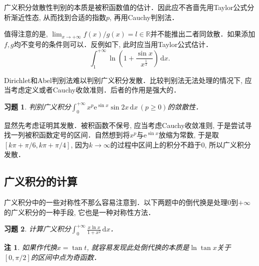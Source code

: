\documentclass[11pt,a4paper]{ctexart}
\makeatletter
\theoremstyle{thmseries} %
\theoremstyle{exerseries}
\newtheorem{exer}{习题}[section]
\newtheorem*{rem}{注}
\renewenvironment{proof}[1][\proofname]{\par
  \pushQED{\qed}%
  \normalfont \topsep6\p@\@plus6\p@\relax
  \trivlist
  \item[\hskip\labelsep
        \itshape
    #1\@addpunct{}]\ignorespaces
}{%
  \popQED\endtrivlist\@endpefalse
}
\newenvironment{sol}{\begin{proof}[\bfseries\upshape 解\quad]}{\end{proof}}
\newcommand{\bra}[1]{\mathopen{}\left(#1\right)}
\newcommand{\sbra}[1]{\mathopen{}\left[#1\right]}
\newcommand{\R}{\mathbb{R}}
\renewcommand{\d}{\mathrm{d}}
\newcommand{\e}{\mathrm{e}}
\makeatother
\begin{document}
广义积分敛散性判别的本质是被积函数值的估计．因此应不吝啬先用Taylor公式分析渐近性态, 从而找到合适的指数$p$, 再用Cauchy判别法．

值得注意的是, $\lim_{x\to+\infty}f(x)/g(x)=l\in\R$并不能推出二者同敛散．如果添加$f,g$均不变号的条件则可以．反例如下, 此时应当用Taylor公式估计．
\[\int_{1}^{+\infty}\ln\bra{1+\frac{\sin x}{x^\frac{1}{2}}}\,\d x.\]

Dirichlet和Abel判别法难以判别广义积分发散．比较判别法无法处理的情况下, 应当考虑定义或者Cauchy收敛准则．后者的作用是强大的．
\begin{exer}
	判别广义积分$\int_{0}^{+\infty}x^p\e^{\sin x}\sin 2x\,\d x\,(p\geq0)$的敛散性．
\end{exer}
\begin{sol}
	显然先考虑证明其发散．被积函数不保号, 应当考虑Cauchy收敛准则, 于是尝试寻找一列被积函数定号的区间．自然想到将$x^p$与$\e^{\sin x}$放缩为常数, 于是取$[k\pi+\pi/6,k\pi+\pi/4]$, 因为$k\to\infty$的过程中区间上的积分不趋于$0$, 所以广义积分发散．
\end{sol}


\subsection{广义积分的计算}
广义积分中的一些对称性不那么容易注意到．以下两题中的倒代换是处理$0$到$+\infty$的广义积分的一种手段, 它也是一种对称性方法．
\begin{exer}
	计算广义积分$\int_{0}^{+\infty}\frac{x\ln x}{1+x^2}\,\d x$．
\end{exer}
\begin{rem}
	如果作代换$x=\tan t$, 就容易发现此处倒代换的本质是$\ln\tan x$关于$[0,\pi/2]$的区间中点为奇函数．
\end{rem}
\end{document}
